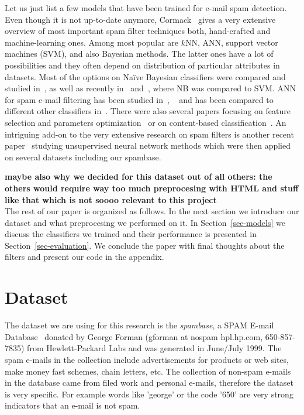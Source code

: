\documentclass[11pt,a4paper]{article}
\begin{document}
Let us just list a few models that have been trained for e-mail spam detection. Even though it is not up-to-date anymore, Cormack~\cite{Cormack-2006} gives a very extensive overview of most important spam filter techniques both, hand-crafted and machine-learning ones. Among most popular are $k$NN, ANN, support vector machines (SVM), and also Bayesian methods. The latter ones have a lot of possibilities and they often depend on distribution of particular attributes in datasets. Most of the options on Na\"ive Bayesian classifiers were compared and studied in~\cite{Metsis-2006}, as well as recently in~\cite{Eberhardt-2015} and~\cite{sah-2017}, where NB was compared to SVM. ANN for spam e-mail filtering has been studied in~\cite{puniskis-2006}, ~\cite{Idris-2011} and has been compared to different other classifiers in~\cite{deepa-2010}.
%
There were also several papers focusing on feature selection and parameters optimization~\cite{lee-2010} or on content-based classification~\cite{saab-2014}. An intriguing add-on to the very extensive research on spam filters is another recent paper~\cite{asadi-2017} studying unsupervised neural network methods which were then applied on several datasets including our spambase.


\bigskip
\textbf{maybe also why we decided for this dataset out of all others: the others would require way too much preprocesing with HTML and stuff like that which is not soooo relevant to this project}\\


The rest of our paper is organized as follows. In the next section we introduce our dataset and what preprocesing we performed on it. In Section~\ref{sec-models} we discuss the classifiers we trained and their performance is presented in Section~\ref{sec-evaluation}. We conclude the paper with final thoughts about the filters and present our code in the appendix.

\section{Dataset}
\label{sec-data}

The dataset we are using for this research is the {\em spambase}, a SPAM E-mail Database~\cite{spambase} donated by George Forman (gforman at nospam hpl.hp.com, 650-857-7835) from Hewlett-Packard Labs and was generated in June/July 1999. 
The spam e-mails in the collection include advertisements for products or web sites, make money fast schemes, chain letters, etc. The collection of non-spam e-mails in the database came from filed work and personal e-mails, therefore the dataset is very specific. For example words like 'george' or the code '650' are very strong indicators that an e-mail is not spam. 
\end{document}

